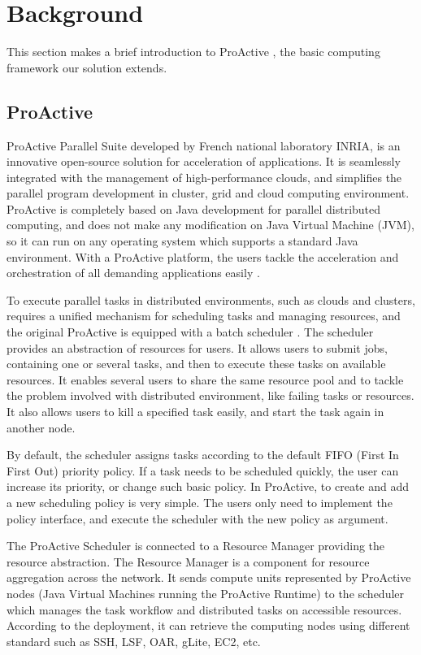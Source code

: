 \section{Background}

This section makes a brief introduction to ProActive \cite{huet04high}, the basic computing framework our solution extends.

\subsection{ProActive}

ProActive Parallel Suite developed by French national laboratory INRIA, is an innovative open-source solution for acceleration of applications. It is seamlessly integrated with the management of high-performance clouds, and simplifies the parallel program development in cluster, grid and cloud computing environment. ProActive is completely based on Java development for parallel distributed computing, and does not make any modification on Java Virtual Machine (JVM), so it can run on any operating system which supports a standard Java environment. With a ProActive platform, the users tackle the acceleration and orchestration of all demanding applications easily \cite{ProActive}.

To execute parallel tasks in distributed environments, such as clouds and clusters, requires a unified mechanism for scheduling tasks and managing resources, and the original ProActive is equipped with a batch scheduler \cite{ProActiveScheduling}. The scheduler provides an abstraction of resources for users. It allows users to submit jobs, containing one or several tasks, and then to execute these tasks on available resources. It enables several users to share the same resource pool and to tackle the problem involved with distributed environment, like failing tasks or resources. It also allows users to kill a specified task easily, and start the task again in another node.

By default, the scheduler assigns tasks according to the default FIFO (First In First Out) priority policy. If a task needs to be scheduled quickly, the user can increase its priority, or change such basic policy. In ProActive, to create and add a new scheduling policy is very simple. The users only need to implement the policy interface, and execute the scheduler with the new policy as argument.

The ProActive Scheduler \cite{pascheduling} is connected to a Resource Manager \cite{parm} providing the resource abstraction. The Resource Manager is a component for resource aggregation across the network. It sends compute units represented by ProActive nodes (Java Virtual Machines running the ProActive Runtime)   to the scheduler which manages the task workflow and distributed tasks on accessible resources. According to the deployment, it can retrieve the computing nodes using different standard such as SSH, LSF, OAR, gLite, EC2, etc.

